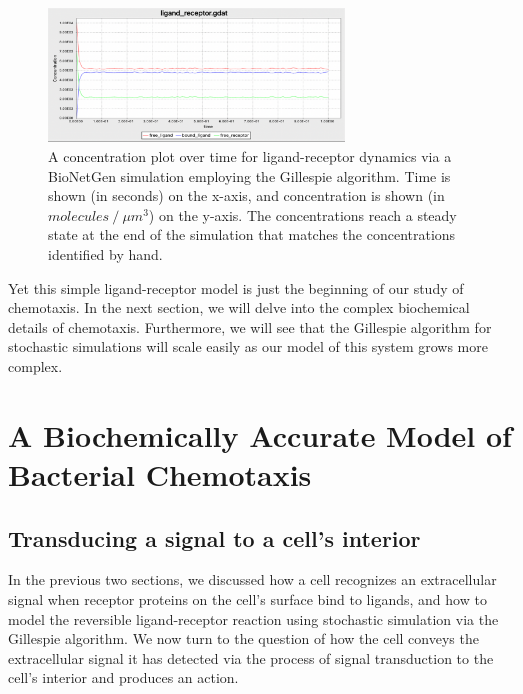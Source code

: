 \begin{figure}[h]
\centering
\mySfFamily
\includegraphics[width = 0.7\textwidth]{../images/chemotaxis_tutorial4_ssa.png}
\caption{A concentration plot over time for ligand-receptor dynamics via a BioNetGen simulation employing the Gillespie algorithm. Time is shown (in seconds) on the x-axis, and concentration is shown (in $molecules\mathbin{/}\mu m^3$) on the y-axis. The concentrations reach a steady state at the end of the simulation that matches the concentrations identified by hand.}
\label{fig:chemotaxis_tutorial4_ssa}
\end{figure}

Yet this simple ligand-receptor model is just the beginning of our study of chemotaxis. In the next section, we will delve into the complex biochemical details of chemotaxis. Furthermore, we will see that the Gillespie algorithm for stochastic simulations will scale easily as our model of this system grows more complex.

\FloatBarrier
{}

\section{A Biochemically Accurate Model of Bacterial Chemotaxis}
\label{sec:a_biochemically_accurate_model_of_bacterial_chemotaxis}

\subsection{Transducing a signal to a cell's interior}

In the previous two sections, we discussed how a cell recognizes an extracellular signal when receptor proteins on the cell's surface bind to ligands, and how to model the reversible ligand-receptor reaction using stochastic simulation via the Gillespie algorithm. We now turn to the question of how the cell conveys the extracellular signal it has detected via the process of signal transduction to the cell's interior and produces an action.

